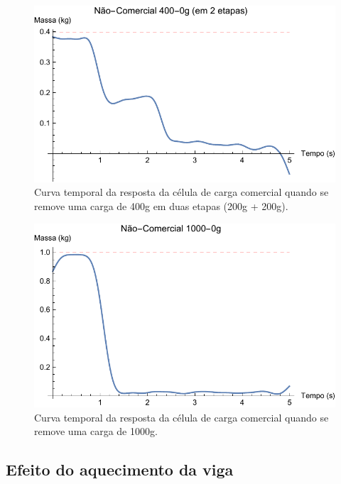 \documentclass[a4paper]{instrumentacao}
\begin{document}
\begin{figure}[H]
\center
\includegraphics[width=\textwidth]{NaoComercial_400g-0_etapa.pdf}
\caption{Curva temporal da resposta da célula de carga comercial quando se remove uma carga de 400g em duas etapas (200g + 200g).}
\label{fig:celula-nao-comercial-resultado-400-0g-etapa}
\end{figure}

\begin{figure}[H]
\center
\includegraphics[width=\textwidth]{NaoComercial_1000g-0.pdf}
\caption{Curva temporal da resposta da célula de carga comercial quando se remove uma carga de 1000g.}
\label{fig:celula-nao-comercial-resultado-1000-0g}
\end{figure}


\subsection{Efeito do aquecimento da viga}
\end{document}
